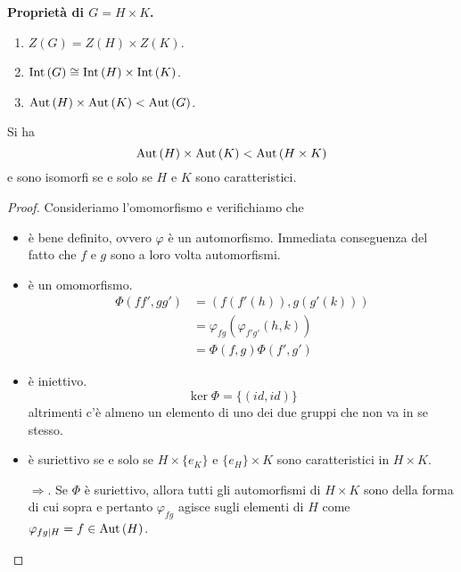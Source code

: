 \begin{multicols}{2}
\textbf{Proprietà di $ G = H \times K $.}
\begin{enumerate}
	\item $ Z(G) = Z(H) \times Z(K) $.
	\item $ \mathrm{Int}\left( G \right) \cong \mathrm{Int}\left( H \right) \times \mathrm{Int}\left( K \right) $.
	\item $ \mathrm{Aut}\left( H \right) \times \mathrm{Aut}\left( K \right) < \mathrm{Aut}\left( G \right) $.
\end{enumerate}
\begin{theorem}
	Si ha $$  \mathrm{Aut}\left( H \right) \times \mathrm{Aut}\left( K \right) < \mathrm{Aut}\left( H \times K \right)  $$ e sono isomorfi se e solo se $ H $ e $ K $ sono caratteristici.
\end{theorem}
\begin{proof}
	Consideriamo l'omomorfismo 
	e verifichiamo che
	\begin{itemize}
		\item è bene definito, ovvero $ \varphi $ è un automorfismo. Immediata conseguenza del fatto che $ f $ e $ g $ sono a loro volta automorfismi.
		\item è un omomorfismo.  \begin{align*}
			\Phi(ff',gg') &= \left( f(f'(h)), g(g'(k)) \right)\\& = \varphi_{fg}(\varphi_{f'g'}(h, k)) \\&= \Phi(f, g)\Phi(f',g') 
		\end{align*}
		\item è iniettivo.
		\[ \ker\Phi = \{ (id, id) \} \]
		altrimenti c'è almeno un elemento di uno dei due gruppi che non va in se stesso.
		
		\item è suriettivo se e solo se $ H\times\{e_K\} $ e $ \{e_H\}\times K $ sono caratteristici in $ H \times K $.
		
		$ \Rightarrow $. Se $ \Phi $ è suriettivo, allora tutti gli automorfismi di $ H \times K $ sono della forma di cui sopra e pertanto $ \varphi_{fg} $ agisce sugli elementi di $ H $ come $ \varphi_{fg|H} = f \in \mathrm{Aut}\left( H \right) $.
		

\end{itemize}
\end{proof}
\end{multicols}
